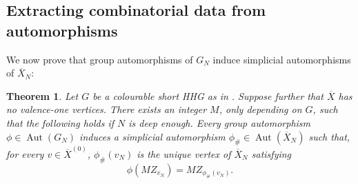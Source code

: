 \documentclass[svgnames]{amsart}
\theoremstyle{plain}
\newtheorem{thm}{Theorem}[section]
\theoremstyle{definition}
\newcommand{\Aut}[1]{\operatorname{Aut}\left(#1\right)}
\newcommand{\ov}[1]{\overline{#1}}
\begin{document}
\subsection{Extracting combinatorial data from automorphisms}
We now prove that group automorphisms of $G_N$ induce simplicial automorphisms of $\ov X_N$:
\begin{thm}\label{thm:extract}
    Let $G$ be a colourable short HHG as in . Suppose further that $\ov X$ has no valence-one vertices. There exists an integer $M$, only depending on $G$, such that the following holds if $N$ is deep enough. Every group automorphism $\phi\in\Aut{G_N}$ induces a simplicial automorphism $\phi_{\#}\in \Aut{\ov X_N}$ such that, for every $v\in \ov X^{(0)}$, $\phi_{\#}(v_N)$ is the unique vertex of $\ov X_N$ satisfying $$\phi(MZ_{v_N})=MZ_{\phi_{\#}(v_N)}.$$
\end{thm}
\end{document}
